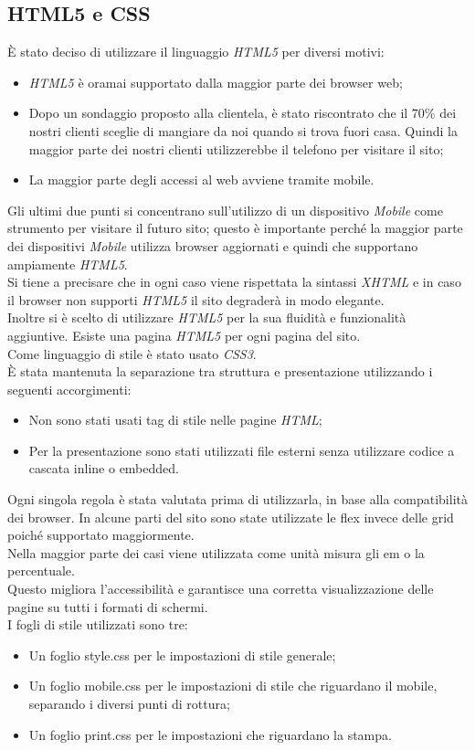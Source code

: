 \subsection{HTML5 e CSS}
È stato deciso di utilizzare il linguaggio \emph{HTML5} per diversi motivi:
\begin{itemize} %
	\item \emph{HTML5} è oramai supportato dalla maggior parte dei browser web;
	\item Dopo un sondaggio proposto alla clientela, è stato riscontrato che il 70\% dei nostri clienti sceglie di mangiare da noi quando si trova fuori casa. 
	Quindi la maggior parte dei nostri clienti utilizzerebbe il telefono per visitare il sito;
	\item La maggior parte degli accessi al web avviene tramite mobile.
\end{itemize}
Gli ultimi due punti si concentrano sull'utilizzo di un dispositivo \emph{Mobile} come strumento per visitare il futuro sito; questo è importante perché la maggior parte dei dispositivi \emph{Mobile} utilizza browser aggiornati e quindi che supportano ampiamente \emph{HTML5}.\\
Si tiene a precisare che in ogni caso viene rispettata la sintassi \emph{XHTML} e in caso il browser non supporti \emph{HTML5} il sito degraderà in modo elegante.\\
Inoltre si è scelto di utilizzare \emph{HTML5} per la sua fluidità e funzionalità aggiuntive. %
Esiste una pagina \emph{HTML5} per ogni pagina del sito.\\ %
Come linguaggio di stile è stato usato \emph{CSS3}.\\
È stata mantenuta la separazione tra struttura e presentazione utilizzando i seguenti accorgimenti: 
\begin{itemize}
    \item Non sono stati usati tag di stile nelle pagine \emph{HTML};
    \item Per la presentazione sono stati utilizzati file esterni senza utilizzare codice a cascata inline o embedded.
\end{itemize}
Ogni singola regola è stata valutata prima di utilizzarla, in base alla compatibilità dei browser.
In alcune parti del sito sono state utilizzate le flex invece delle grid poiché supportato maggiormente.\\
Nella maggior parte dei casi viene utilizzata come unità misura gli em o la percentuale.\\
Questo migliora l'accessibilità e garantisce una corretta visualizzazione delle pagine su tutti i formati di schermi.\\
I fogli di stile utilizzati sono tre:
\begin{itemize}
	\item Un foglio style.css per le impostazioni di stile generale;
	\item Un foglio mobile.css per le impostazioni di stile che riguardano il mobile, separando i diversi punti di rottura; %
	\item Un foglio print.css per le impostazioni che riguardano la stampa.
\end{itemize}